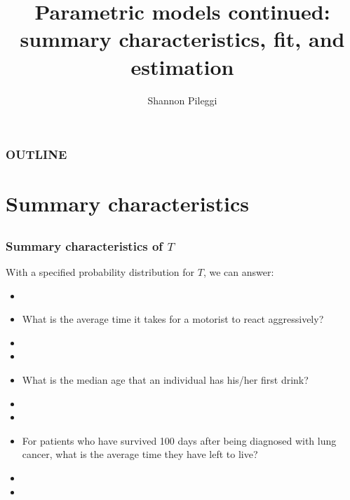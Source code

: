 



\title[Set 3]{Parametric models continued: \\ summary characteristics, fit, and estimation}
\author[Pileggi]{Shannon Pileggi}


\date{}




\begin{frame}
\titlepage
\end{frame}

\begin{frame}
\frametitle{OUTLINE\qquad\qquad\qquad} \tableofcontents[hideallsubsections]
\end{frame}


\section[Summary characteristics]{Summary characteristics}
\subsection{}

\begin{frame}
\frametitle{Summary characteristics of $T$}
 With a specified probability distribution for $T$, we can answer:
\begin{itemize}
\item[]
\item What is the average time it takes for a motorist to react aggressively?
\item[] %
\item[]
\item What is the median age that an individual has his/her first drink?
\item[] %
\item[]
\item For patients who have survived 100 days after being diagnosed with lung cancer, what is the average time they have left to live?
\item[]%
\item[]
\end{itemize}
\end{frame}

